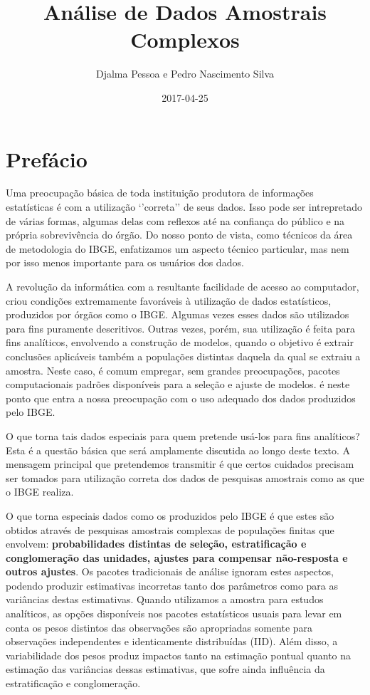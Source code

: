 \documentclass[]{book}
\title{Análise de Dados Amostrais Complexos}
\author{Djalma Pessoa e Pedro Nascimento Silva}
\date{2017-04-25}
\numberwithin{example}{chapter}
\numberwithin{remark}{chapter}
\numberwithin{definition}{chapter}
\begin{document}
\maketitle

{
\setcounter{tocdepth}{1}
\tableofcontents
}
\chapter*{Prefácio}\label{prefacio}

Uma preocupação básica de toda instituição produtora de informações
estatísticas é com a utilização `'correta'' de seus dados. Isso pode ser
intrepretado de várias formas, algumas delas com reflexos até na
confiança do público e na própria sobrevivência do órgão. Do nosso ponto
de vista, como técnicos da área de metodologia do IBGE, enfatizamos um
aspecto técnico particular, mas nem por isso menos importante para os
usuários dos dados.

A revolução da informática com a resultante facilidade de acesso ao
computador, criou condições extremamente favoráveis à utilização de
dados estatísticos, produzidos por órgãos como o IBGE. Algumas vezes
esses dados são utilizados para fins puramente descritivos. Outras
vezes, porém, sua utilização é feita para fins analíticos, envolvendo a
construção de modelos, quando o objetivo é extrair conclusões aplicáveis
também a populações distintas daquela da qual se extraiu a amostra.
Neste caso, é comum empregar, sem grandes preocupações, pacotes
computacionais padrões disponíveis para a seleção e ajuste de modelos. é
neste ponto que entra a nossa preocupação com o uso adequado dos dados
produzidos pelo IBGE.

O que torna tais dados especiais para quem pretende usá-los para fins
analíticos? Esta é a questão básica que será amplamente discutida ao
longo deste texto. A mensagem principal que pretendemos transmitir é que
certos cuidados precisam ser tomados para utilização correta dos dados
de pesquisas amostrais como as que o IBGE realiza.

O que torna especiais dados como os produzidos pelo IBGE é que estes são
obtidos através de pesquisas amostrais complexas de populações finitas
que envolvem: \textbf{probabilidades distintas de seleção,
estratificação e conglomeração das unidades, ajustes para compensar
não-resposta e outros ajustes}. Os pacotes tradicionais de análise
ignoram estes aspectos, podendo produzir estimativas incorretas tanto
dos parâmetros como para as variâncias destas estimativas. Quando
utilizamos a amostra para estudos analíticos, as opções disponíveis nos
pacotes estatísticos usuais para levar em conta os pesos distintos das
observações são apropriadas somente para observações independentes e
identicamente distribuídas (IID). Além disso, a variabilidade dos pesos
produz impactos tanto na estimação pontual quanto na estimação das
variâncias dessas estimativas, que sofre ainda influência da
estratificação e conglomeração.
\end{document}
